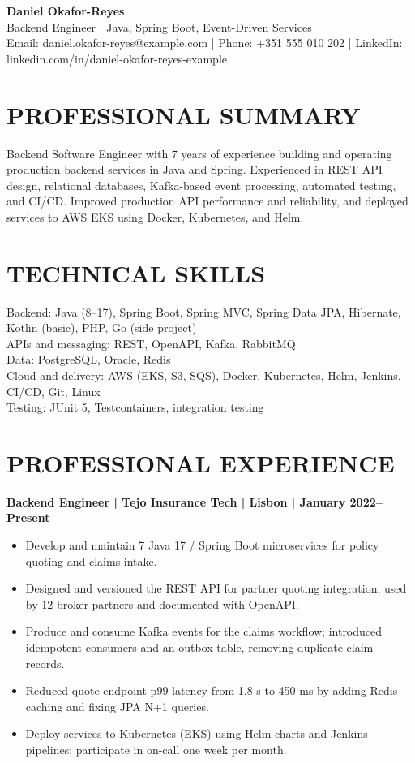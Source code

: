 \documentclass[11pt,a4paper]{article}
\begin{document}
{\begin{center}
{\Huge\bfseries\color{primarycolor} Daniel Okafor-Reyes}\\[0.25em]
{\large\color{accentcolor} Backend Engineer | Java, Spring Boot, Event-Driven Services}\\[0.25em]
Email: daniel.okafor-reyes@example.com | Phone: +351 555 010 202 | LinkedIn: linkedin.com/in/daniel-okafor-reyes-example
\end{center}}

\section*{PROFESSIONAL SUMMARY}
Backend Software Engineer with 7 years of experience building and operating production backend services in Java and Spring. Experienced in REST API design, relational databases, Kafka-based event processing, automated testing, and CI/CD. Improved production API performance and reliability, and deployed services to AWS EKS using Docker, Kubernetes, and Helm.

\section*{TECHNICAL SKILLS}
Backend: Java (8–17), Spring Boot, Spring MVC, Spring Data JPA, Hibernate, Kotlin (basic), PHP, Go (side project)\\
APIs and messaging: REST, OpenAPI, Kafka, RabbitMQ\\
Data: PostgreSQL, Oracle, Redis\\
Cloud and delivery: AWS (EKS, S3, SQS), Docker, Kubernetes, Helm, Jenkins, CI/CD, Git, Linux\\
Testing: JUnit 5, Testcontainers, integration testing

\section*{PROFESSIONAL EXPERIENCE}
\textbf{Backend Engineer | Tejo Insurance Tech | Lisbon | January 2022–Present}
\begin{itemize}
\item Develop and maintain 7 Java 17 / Spring Boot microservices for policy quoting and claims intake.
\item Designed and versioned the REST API for partner quoting integration, used by 12 broker partners and documented with OpenAPI.
\item Produce and consume Kafka events for the claims workflow; introduced idempotent consumers and an outbox table, removing duplicate claim records.
\item Reduced quote endpoint p99 latency from 1.8 s to 450 ms by adding Redis caching and fixing JPA N+1 queries.
\item Deploy services to Kubernetes (EKS) using Helm charts and Jenkins pipelines; participate in on-call one week per month.
\end{itemize}
\end{document}
